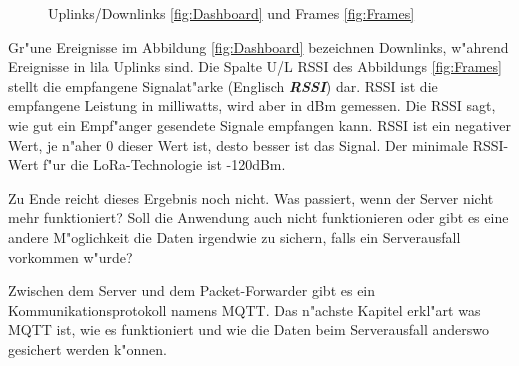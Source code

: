	\begin{figure}[h!]
	
	\caption{Uplinks/Downlinks \ref{fig:Dashboard} und Frames \ref{fig:Frames}}
\end{figure}

\vspace{10cm}
Gr"une Ereignisse im Abbildung \ref{fig:Dashboard} bezeichnen 
Downlinks, w"ahrend Ereignisse in lila Uplinks sind. Die Spalte U/L 
RSSI des Abbildungs \ref{fig:Frames} stellt die empfangene 
Signalat"arke (Englisch \textbf{\textit{\ac{RSSI}}}) dar. RSSI ist die 
empfangene Leistung in milliwatts, wird aber in \ac{dBm} gemessen. 
Die RSSI sagt, wie gut ein Empf"anger gesendete Signale empfangen 
kann. RSSI ist ein negativer Wert, je n"aher 0 dieser Wert ist, desto 
besser ist das Signal. Der minimale RSSI-Wert f"ur die 
LoRa-Technologie ist -120dBm.  

Zu Ende reicht dieses Ergebnis noch nicht. Was passiert, wenn der Server
nicht mehr funktioniert? Soll die Anwendung auch nicht funktionieren
oder gibt es eine andere M"oglichkeit die Daten irgendwie zu sichern,
falls ein Serverausfall vorkommen w"urde? 

\vspace{2cm}
Zwischen dem Server und dem
Packet-Forwarder gibt es ein Kommunikationsprotokoll namens \ac{MQTT}. 
Das n"achste Kapitel erkl"art was MQTT ist, wie es funktioniert und 
wie die Daten beim Serverausfall anderswo gesichert werden k"onnen. 
  
